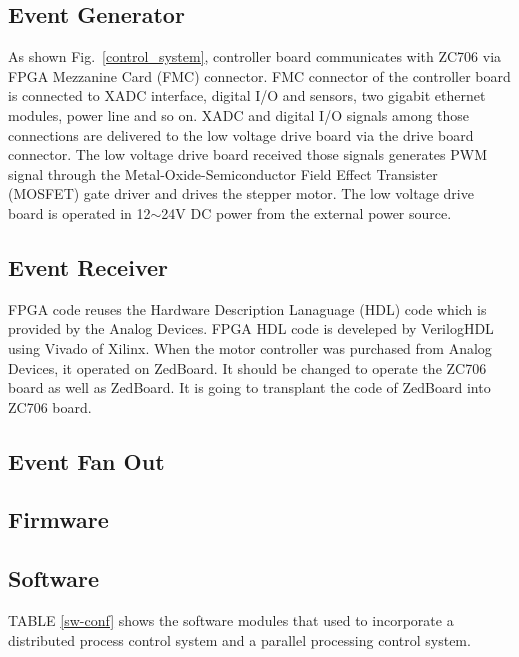 \documentclass[journal]{IEEEtran}
\begin{document}
\subsection{Event Generator}
As shown Fig.~\ref{control_system}, controller board communicates with ZC706 via FPGA Mezzanine Card (FMC) connector. FMC connector of the controller board is connected to XADC interface, digital I/O and sensors, two gigabit ethernet modules, power line and so on. XADC and digital I/O signals among those connections are delivered to the low voltage drive board via the drive board connector. The low voltage drive board received those signals generates PWM signal through the Metal-Oxide-Semiconductor Field Effect Transister (MOSFET) gate driver and drives the stepper motor. The low voltage drive board is operated in 12${\sim}$24V DC power from the external power source.

\subsection{Event Receiver}
FPGA code reuses the Hardware Description Lanaguage (HDL) code which is provided by the Analog Devices. FPGA HDL code is develeped by VerilogHDL using Vivado of Xilinx. When the motor controller was purchased from Analog Devices, it operated on ZedBoard. It should be changed to operate the ZC706 board as well as ZedBoard. It is going to transplant the code of ZedBoard into ZC706 board.


\subsection{Event Fan Out}

\subsection{Firmware}

\subsection{Software}
\hfill\break
TABLE \ref{sw-conf} shows the software modules that used to incorporate a distributed process control system and a parallel processing control system.
\end{document}
